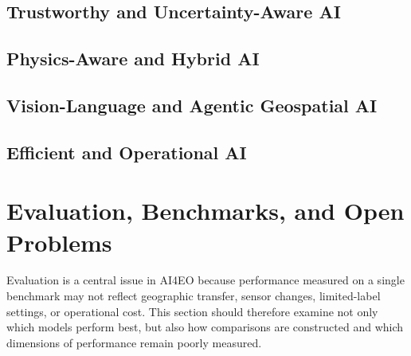 \documentclass[
    11pt,
    a4paper,
    parskip=half,
    bibliography=totoc,
    numbers=noenddot
]{scrartcl}
\begin{document}
\subsection{Trustworthy and Uncertainty-Aware AI}


\subsection{Physics-Aware and Hybrid AI}


\subsection{Vision-Language and Agentic Geospatial AI}


\subsection{Efficient and Operational AI}


\section{Evaluation, Benchmarks, and Open Problems}

Evaluation is a central issue in AI4EO because performance measured on a
single benchmark may not reflect geographic transfer, sensor changes,
limited-label settings, or operational cost. This section should
therefore examine not only which models perform best, but also how
comparisons are constructed and which dimensions of performance remain
poorly measured.
\end{document}
